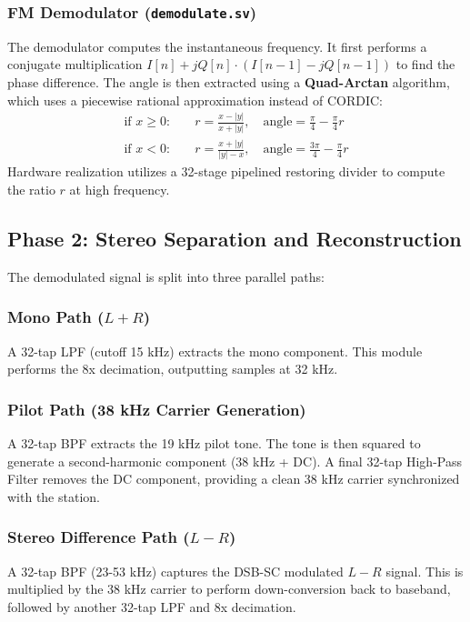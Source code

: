 \subsubsection{FM Demodulator (\texttt{demodulate.sv})}
The demodulator computes the instantaneous frequency. It first performs a conjugate multiplication $I[n] + jQ[n] \cdot (I[n-1] - jQ[n-1])$ to find the phase difference. The angle is then extracted using a \textbf{Quad-Arctan} algorithm, which uses a piecewise rational approximation instead of CORDIC:
\begin{align*}
    \text{if } x \ge 0: & \quad r = \frac{x - |y|}{x + |y|}, \quad \text{angle} = \frac{\pi}{4} - \frac{\pi}{4}r \\
    \text{if } x < 0: & \quad r = \frac{x + |y|}{|y| - x}, \quad \text{angle} = \frac{3\pi}{4} - \frac{\pi}{4}r
\end{align*}
Hardware realization utilizes a 32-stage pipelined restoring divider to compute the ratio $r$ at high frequency.

\subsection{Phase 2: Stereo Separation and Reconstruction}
The demodulated signal is split into three parallel paths:

\subsubsection{Mono Path ($L+R$)}
A 32-tap LPF (cutoff 15 kHz) extracts the mono component. This module performs the 8x decimation, outputting samples at 32 kHz.

\subsubsection{Pilot Path (38 kHz Carrier Generation)}
A 32-tap BPF extracts the 19 kHz pilot tone. The tone is then squared to generate a second-harmonic component (38 kHz + DC). A final 32-tap High-Pass Filter removes the DC component, providing a clean 38 kHz carrier synchronized with the station.

\subsubsection{Stereo Difference Path ($L-R$)}
A 32-tap BPF (23-53 kHz) captures the DSB-SC modulated $L-R$ signal. This is multiplied by the 38 kHz carrier to perform down-conversion back to baseband, followed by another 32-tap LPF and 8x decimation.

